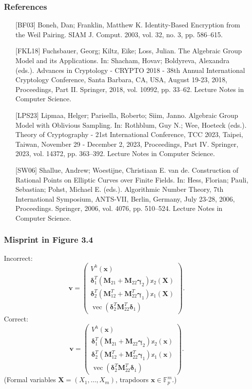 \documentclass[9pt]{beamer}
\newcommand{\F}{\mathbb{F}}
\DeclareMathOperator{\vectorization}{vec}
\begin{document}
\begin{frame}[noframenumbering]
\frametitle{References}
\begin{itemize}
    \item[{[}BF03{]}] Boneh, Dan; Franklin, Matthew K. Identity-Based Encryption from the Weil Pairing. SIAM J. Comput. 2003, vol. 32, no. 3, pp. 586–615.
    \item[{[}FKL18{]}] Fuchsbauer, Georg; Kiltz, Eike; Loss, Julian. The Algebraic Group Model and its Applications. In: Shacham, Hovav; Boldyreva, Alexandra (eds.). Advances in Cryptology - CRYPTO 2018 - 38th Annual International Cryptology Conference, Santa Barbara, CA, USA, August 19-23, 2018, Proceedings, Part II. Springer, 2018, vol. 10992, pp. 33–62. Lecture Notes in Computer Science.
    \item[{[}LPS23{]}] Lipmaa, Helger; Parisella, Roberto; Siim, Janno. Algebraic Group Model with Oblivious Sampling. In: Rothblum, Guy N.; Wee, Hoeteck (eds.). Theory of Cryptography - 21st International Conference, TCC 2023, Taipei, Taiwan, November 29 - December 2, 2023, Proceedings, Part IV. Springer, 2023, vol. 14372, pp. 363–392. Lecture Notes in Computer Science.
    \item[{[}SW06{]}] Shallue, Andrew; Woestijne, Christiaan E. van de. Construction of Rational Points on Elliptic Curves over Finite Fields. In: Hess, Florian; Pauli, Sebastian; Pohst, Michael E. (eds.). Algorithmic Number Theory, 7th International Symposium, ANTS-VII, Berlin, Germany, July 23-28, 2006, Proceedings. Springer, 2006, vol. 4076, pp. 510–524. Lecture Notes in Computer Science.
\end{itemize}
\end{frame}


\begin{frame}[noframenumbering]
\frametitle{Misprint in Figure 3.4}
Incorrect:
\[
\bm v = 
    \begin{pmatrix}
        V^h(\bm x) \\
        \bm{\delta}_1^T(\bm M_{21} + \bm M_{22} \bm \gamma_2) \mathbb x_2(\bm X) \\
        \bm{\delta}_2^T(\bm M_{12}^T + \bm M_{22}^T \bm \gamma_1) \mathbb x_1(\bm X) \\
        \vectorization(\bm \delta_2^T \bm M_{22}^T \bm \delta_1)
    \end{pmatrix}.
\]
Correct:
\[
\bm v = 
    \begin{pmatrix}
        V^h(\bm x) \\
        \bm{\delta}_1^T(\bm M_{21} + \bm M_{22} \bm \gamma_2) \mathbb x_2(\bm x) \\
        \bm{\delta}_2^T(\bm M_{12}^T + \bm M_{22}^T \bm \gamma_1) \mathbb x_1(\bm x) \\
        \vectorization(\bm \delta_2^T \bm M_{22}^T \bm \delta_1)
    \end{pmatrix}.
\]
(Formal variables $ \bm X = (X_1, \dots, X_m) $, trapdoors $ \bm x \in \F_p^m $.)
\end{frame}
\end{document}
